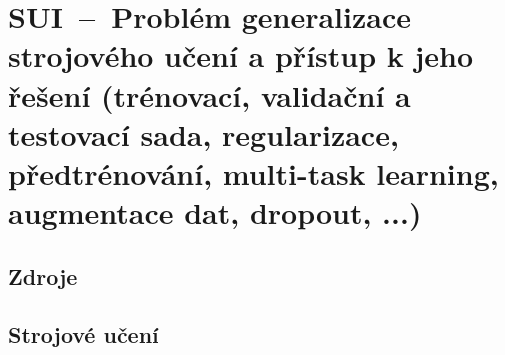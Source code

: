 

\graphicspath{{sui/strojove_uceni_generalizace/figures}}


\chapter{SUI~--~Problém generalizace strojového učení a přístup k jeho řešení (trénovací, validační a testovací sada, regularizace, předtrénování, multi-task learning, augmentace dat, dropout, ...)}


\section{Zdroje}

\begin{compactitem}
    \item {}
    \item {}
    \item {}
    \item {}
\end{compactitem}


\section{Strojové učení}

